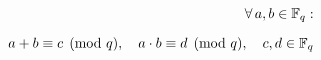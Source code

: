 \documentclass[preview]{standalone}
\begin{document}
\begin{align*}
\special{dvisvgm:raw <g id='unique000'>}\forall\, a, b \in \mathbb{F}_q: \\[6pt] a+b \equiv c \pmod{q},\quad a\cdot b \equiv d \pmod{q}, \quad c,d \in \mathbb{F}_q\special{dvisvgm:raw </g>}
\end{align*}
\end{document}
